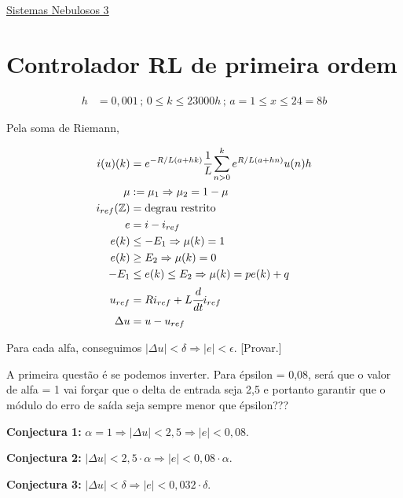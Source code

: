 \documentclass[12pt]{article}
\begin{document}
\Large

\begin{center}
\href{https://www.youtube.com/watch?v=2E0TYW42x1c}{\color{blue}\underline{Sistemas Nebulosos 3}}
\end{center}

\normalsize

\vspace{3mm}

\section{Controlador RL de primeira ordem}

\begin{align}
  h &= 0,001\,;\,0 \le k \le 23000 h\,;\,a = 1 \le x \le 24 = 8b
\end{align}

Pela soma de Riemann,

\begin{align}
  i(u)(k) &= e^{-R/L (a + hk)}\cfrac{1}{L}\sum_{n > 0}^k e^{R/L (a + hn)} u(n) h \\  \mu &:= \mu_1 \Rightarrow \mu_2 = 1 - \mu \\
  i_{ref}(\mathbb{Z}) &= \text{degrau restrito} \\
  e &= i - i_{ref} \\
  e(k) &\le - E_1 \Rightarrow \mu(k) = 1 \\
  e(k) &\ge E_2 \Rightarrow \mu(k) = 0 \\
  - E_1 &\le e(k) \le E_2 \Rightarrow \mu(k) = p e(k) + q \\
  u_{ref} &= R i_{ref} + L \cfrac{d}{dt} i_{ref} \\
  \Delta u &= u - u_{ref}
\end{align}

Para cada alfa, conseguimos $| \Delta u | < \delta \Rightarrow | e | < \epsilon$. [Provar.]

A primeira quest\~ao \'e se podemos inverter. Para \'epsilon = 0,08, ser\'a que o valor de alfa = 1 vai for\c{c}ar que o delta de entrada seja 2,5 e portanto garantir que o m\'odulo do erro de sa\'ida seja sempre menor que \'epsilon???

\textbf{Conjectura 1: }$\alpha = 1 \Rightarrow |\Delta u| < 2,5 \Rightarrow |e| < 0,08$.

\textbf{Conjectura 2: }$ |\Delta u| < 2,5\cdot \alpha \Rightarrow |e| < 0,08\cdot \alpha $.

\textbf{Conjectura 3: }$ |\Delta u| < \delta \Rightarrow |e| < 0,032\cdot \delta$.
\end{document}
